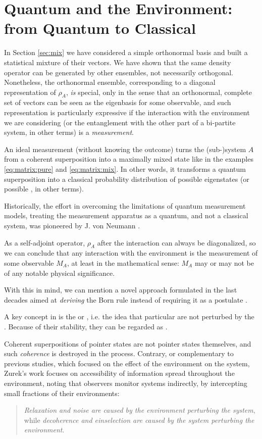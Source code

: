 \section{Quantum and the Environment: from Quantum to Classical}
\label{sec:q2c}

In Section \ref{sec:mix} we have considered a simple orthonormal basis
and built a statistical mixture of their vectors. We have shown
that the same density operator can be generated by other ensembles,
not necessarily orthogonal. Nonetheless, the orthonormal ensemble,
corresponding to a diagonal representation of $\rho_A$, \emph{is}
special, only in the sense that an orthonormal, complete set of
vectors can be seen as the eigenbasis for some observable,
and such representation is particularly expressive if the
interaction with the environment we are considering
(or the entanglement with the other part of a bi-partite system, in other terms)
is a \emph{measurement}.

An ideal measurement (without knowing the outcome) turns
the (sub-)system $A$ from a coherent superposition into a
maximally mixed state like in the examples
\eqref{eq:matrix:pure} and \eqref{eq:matrix:mix}.
In other words, it transforms a quantum superposition into a classical probability
distribution of possible eigenstates (or possible , in other terms).

Historically,
the effort in overcoming the limitations of quantum measurement models,
treating the measurement apparatus as a quantum,
and not a classical system,
was pioneered by J. von Neumann \parencite{VonNeumann}.

As a self-adjoint operator, $\rho_A$ after the interaction
can always be diagonalized, so we can conclude that any
interaction with the environment is the measurement of some
observable $M_A$, at least in the mathematical sense: $M_A$ may or
may not be of any notable physical significance.

With this in mind, we can mention
a novel approach formulated in the last decades aimed at
\emph{deriving}
the Born rule
instead of requiring it as a postulate
\parencite{Zurek_Einselect}.

A key concept in \cite{Zurek_Einselect} is the
 or ,
i.e. the idea that particular  are not
perturbed by the .
Because of their stability, they can be regarded as
.

Coherent superpositions of pointer states are not pointer states
themselves, and such \emph{coherence} is destroyed in the process.
Contrary,
or complementary to previous studies, which focused on the effect of
the environment on the system, Zurek's work
focuses on
accessibility of information spread throughout the environment,
noting that observers monitor systems indirectly, by intercepting
small fractions of their environments:
\begin{quote}
\emph{Relaxation and noise are caused by the environment perturbing
the system}, while \emph{decoherence and einselection
are caused by the system perturbing the environment}.
\end{quote}
